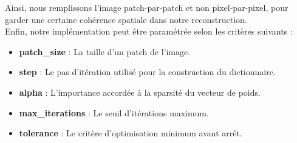 \documentclass[a4paper]{memoir}
\begin{document}
Ainsi, nous remplissons l'image patch-par-patch et non pixel-par-pixel, pour garder une certaine cohérence spatiale dans notre reconstruction.\\

Enfin, notre implémentation peut être paramétrée selon les critères suivants :
\begin{itemize}
\item \textbf{patch\_size} : La taille d'un patch de l'image.
\item \textbf{step} : Le pas d'itération utilisé pour la construction du dictionnaire.
\item \textbf{alpha} : L'importance accordée à la sparsité du vecteur de poids. 
\item \textbf{max\_iterations} : Le seuil d'itérations maximum.
\item \textbf{tolerance} : Le critère d'optimisation minimum avant arrêt.
\end{itemize}


\newpage
\end{document}
